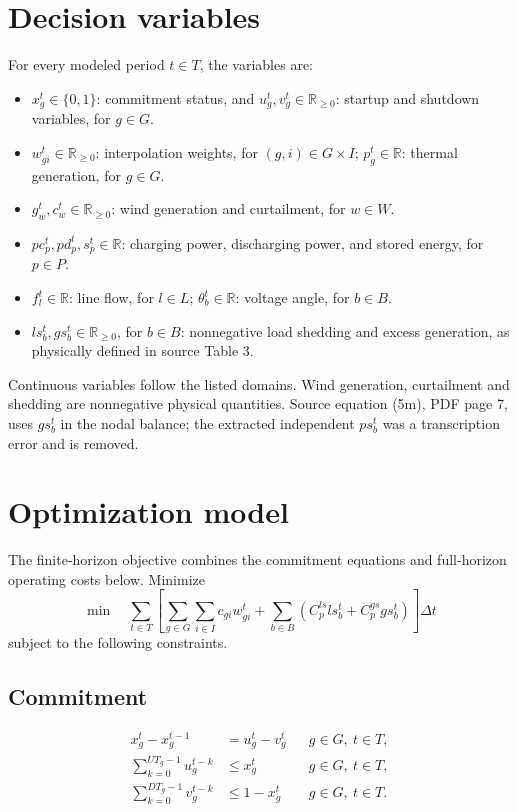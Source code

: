 \documentclass[11pt,a4paper]{article}
\begin{document}
\section{Decision variables}
For every modeled period $t\in T$, the variables are:
\begin{itemize}
\item $x_g^t\in\{0,1\}$: commitment status, and $u_g^t,v_g^t\in\mathbb R_{\geq0}$: startup and shutdown variables, for $g\in G$.
\item $w_{gi}^t\in\mathbb R_{\geq0}$: interpolation weights, for $(g,i)\in G\times I$; $p_g^t\in\mathbb R$: thermal generation, for $g\in G$.
\item $g_w^t,c_w^t\in\mathbb R_{\geq0}$: wind generation and curtailment, for $w\in W$.
\item $pc_p^t,pd_p^t,s_p^t\in\mathbb R$: charging power, discharging power, and stored energy, for $p\in P$.
\item $f_l^t\in\mathbb R$: line flow, for $l\in L$; $\theta_b^t\in\mathbb R$: voltage angle, for $b\in B$.
\item $ls_b^t,gs_b^t\in\mathbb R_{\geq0}$, for $b\in B$: nonnegative load shedding and excess generation, as physically defined in source Table 3.
\end{itemize}
Continuous variables follow the listed domains. Wind generation, curtailment and shedding are nonnegative physical quantities. Source equation (5m), PDF page 7, uses $gs_b^t$ in the nodal balance; the extracted independent $ps_b^t$ was a transcription error and is removed.

\section{Optimization model}
The finite-horizon objective combines the commitment equations and full-horizon operating costs below. Minimize
\begin{equation}
\min\quad
\sum_{t\in T}\left[
\sum_{g\in G}\sum_{i\in I}c_{gi}w_{gi}^t
+\sum_{b\in B}\left(C_p^{ls}ls_b^t+C_p^{gs}gs_b^t\right)
\right]\Delta t
\end{equation}
subject to the following constraints.

\subsection*{Commitment}
\begin{align}
x_g^t-x_g^{t-1}&=u_g^t-v_g^t
&&g\in G,\ t\in T,\\
\sum_{k=0}^{UT_g-1}u_g^{t-k}&\leq x_g^t
&&g\in G,\ t\in T,\\
\sum_{k=0}^{DT_g-1}v_g^{t-k}&\leq1-x_g^t
&&g\in G,\ t\in T.
\end{align}
\end{document}
